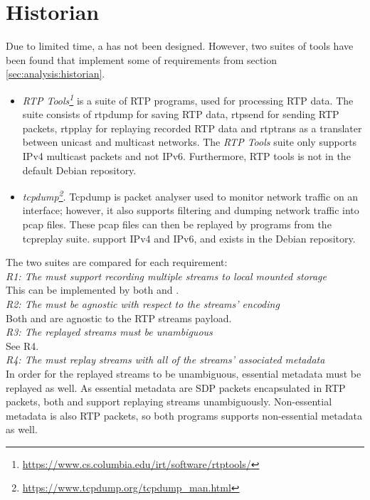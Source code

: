 \section{Historian} \label{sec:design:historian}
Due to limited time, a \hist{} has not been designed. However, two suites of tools have been found that implement some of requirements from section \ref{sec:analysis:historian}.

\begin{itemize}
	\item \textit{RTP Tools\footnote{\url{https://www.cs.columbia.edu/irt/software/rtptools/}}} is a suite of RTP programs, used for processing RTP data. The suite consists of rtpdump for saving RTP data, rtpsend for sending RTP packets, rtpplay for replaying recorded RTP data and rtptrans as a translater between unicast and multicast networks. The \textit{RTP Tools} suite only supports IPv4 multicast packets and not IPv6. Furthermore, RTP tools is not in the default Debian repository.
	
	\item \textit{tcpdump\footnote{\url{https://www.tcpdump.org/tcpdump_man.html}}}. Tcpdump is packet analyser used to monitor network traffic on an interface; however, it also supports filtering and dumping network traffic into pcap files. These pcap files can then be replayed by programs from the tcpreplay suite.  support IPv4 and IPv6, and exists in the Debian repository.
\end{itemize}

\noindent{}The two suites are compared for each requirement:\\
\textit{R1: The  must support recording multiple streams to local mounted storage}\\
This can be implemented by both  and . \\

\noindent\textit{R2: The  must be agnostic with respect to the streams' encoding} \\
Both  and  are agnostic to the RTP streams payload.\\

\noindent\textit{R3: The replayed streams must be unambiguous}\\
See R4.\\

\noindent\textit{R4: The  must replay streams with all of the streams' associated metadata}\\
In order for the replayed streams to be unambiguous, essential metadata must be replayed as well. As essential metadata are SDP packets encapsulated in RTP packets, both  and  support replaying streams unambiguously. Non-essential metadata is also RTP packets, so both programs supports non-essential metadata as well.\\

